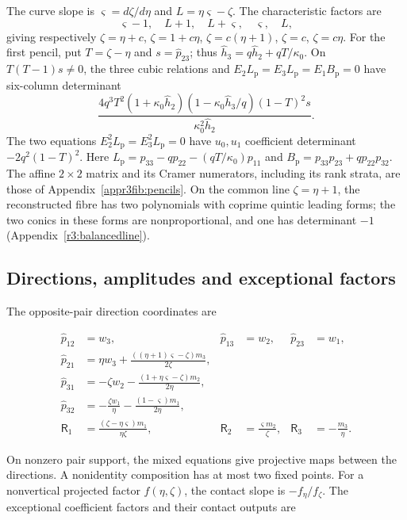 The curve slope is $\varsigma=d\zeta/d\eta$ and
$L=\eta\varsigma-\zeta$. The characteristic factors are
\[
 \varsigma-1,\quad L+1,\quad L+\varsigma,
 \quad\varsigma,\quad L,
\]
giving respectively $\zeta=\eta+c$, $\zeta=1+c\eta$,
$\zeta=c(\eta+1)$, $\zeta=c$, $\zeta=c\eta$.
For the first pencil, put $T=\zeta-\eta$ and
$s=\widehat p_{23}$; thus
$\widehat h_3=q\widehat h_2+qT/\kappa_0$.
On $T(T-1)s\ne0$, the three cubic
relations and $E_2L_{\mathrm p}=E_3L_{\mathrm p}=E_1B_{\mathrm p}=0$
have six-column determinant
\[
 \frac{4q^3T^2(1+\kappa_0\widehat h_2)
 (1-\kappa_0\widehat h_3/q)(1-T)^2s}{\kappa_0^2\widehat h_2}.
\]
The two equations $E_2^2L_{\mathrm p}=E_3^2L_{\mathrm p}=0$ have
$u_0,u_1$ coefficient determinant $-2q^2(1-T)^2$.
Here $L_{\mathrm p}=p_{33}-qp_{22}-(qT/\kappa_0)p_{11}$ and
$B_{\mathrm p}=p_{33}p_{23}+qp_{22}p_{32}$.
The affine $2\times2$ matrix and its Cramer numerators, including its
rank strata, are those of Appendix~\ref{appr3fib:pencils}.
On the common line $\zeta=\eta+1$, the reconstructed fibre has two
polynomials with coprime quintic leading forms; the two conics in
these forms are nonproportional, and one has determinant $-1$
(Appendix~\ref{r3:balancedline}).

\subsection{Directions, amplitudes and exceptional factors}

The opposite-pair direction coordinates are

\begin{equation}\label{supp:r3:directioncoordinates}
\begin{aligned}
 \widehat p_{12}&=w_3,&\widehat p_{13}&=w_2,&\widehat p_{23}&=w_1,\\
 \widehat p_{21}&=\eta w_3+\frac{((\eta +1)\varsigma -\zeta )m_3}{2\zeta },\\
 \widehat p_{31}&=-\zeta w_2-\frac{(1+\eta \varsigma -\zeta )m_2}{2\eta },\\
 \widehat p_{32}&=-\frac{\zeta w_1}{\eta }-\frac{(1-\varsigma )m_1}{2\eta },\\
 \mathsf R_1&=\frac{(\zeta -\eta \varsigma )m_1}{\eta \zeta },&
 \mathsf R_2&=\frac{\varsigma m_2}{\zeta },&\mathsf R_3&=-\frac{m_3}{\eta }.
\end{aligned}
\end{equation}

On nonzero pair support, the mixed equations give projective maps
between the directions. A nonidentity composition has at most two
fixed points. For a nonvertical projected factor $f(\eta,\zeta)$,
the contact slope is $-f_\eta/f_\zeta$.
The exceptional coefficient factors and their contact outputs are

